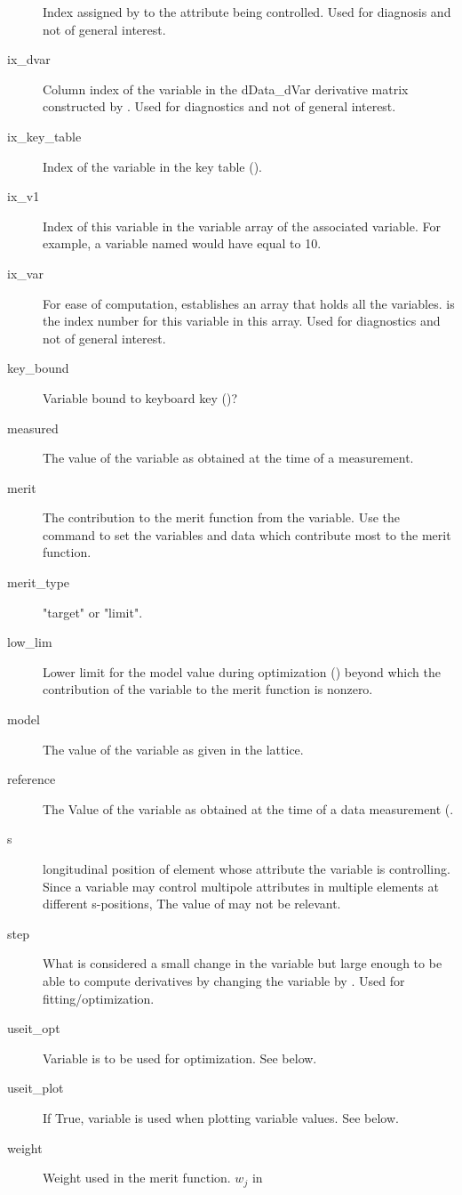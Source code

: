 \begin{description}
Index assigned by \bmad to the attribute being controlled. Used for diagnosis and not
of general interest.
  \item[ix_dvar] \Newline
Column index of the variable in the dData_dVar derivative matrix constructed by \tao.
Used for diagnostics and not of general interest.
  \item[ix_key_table] \Newline
Index of the variable in the key table ().
  \item[ix_v1] \Newline
Index of this variable in the variable array of the associated  variable.
For example, a variable named  would have  equal to 10.
  \item[ix_var] \Newline
For ease of computation, \tao establishes an array that holds all the variables.
 is the index number for this variable in this array. 
Used for diagnostics and not of general interest.
  \item[key_bound] \Newline
Variable bound to keyboard key ()?
  \item[measured] \Newline
The value of the variable as obtained at the time of a  measurement.
  \item[merit] \Newline
The contribution to the merit function  from the variable. Use the 
command to set the variables and data which contribute most to the merit function.
  \item[merit_type] \Newline
"target" or "limit".
  \item[low_lim] \Newline
Lower limit for the model value during optimization () beyond which
the contribution of the variable to the merit function is nonzero.
  \item[model] \Newline
The value of the variable as given in the  lattice.
  \item[reference] \Newline
The Value of the variable as obtained at the time of a  data measurement
(.
  \item[s] \Newline
longitudinal position of element whose attribute the variable is controlling.  Since a
variable may control multipole attributes in multiple elements at different s-positions,
The value of  may not be relevant.
  \item[step] \Newline
What is considered a small change in the variable but large enough to be able to compute
derivatives by changing the variable by . Used for fitting/optimization.  
  \item[useit_opt] \Newline
Variable is to be used for optimization. See below.
  \item[useit_plot] \Newline
If True, variable is used when plotting variable values. See below.
  \item[weight] \Newline
Weight used in the merit function. $w_j$ in 
  \end{description}

